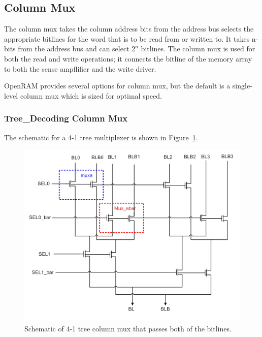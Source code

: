 \subsection{Column Mux}

The column mux takes the column address bits from the address bus
selects the appropriate bitlines for the word that is to be read from
or written to.  It takes n-bits from the address bus and can select
$2^n$ bitlines. The column mux is used for both the read and write
operations; it connects the bitline of the memory array to both the
sense ampflifier and the write driver.

OpenRAM provides several options for column mux, but the default
is a single-level column mux which is sized for optimal speed.

\subsubsection{Tree\_Decoding Column Mux}
\label{sec:tree_decoding_column_mux}

The schematic for a 4-1 tree
multiplexer is shown in Figure~\ref{fig:colmux}.

\begin{figure}[h!]
\centering
\includegraphics[scale=.9]{./figs/tree_column_mux_schem.pdf}
\caption{Schematic of 4-1 tree column mux that passes both of the bitlines.}
\label{fig:colmux}
\end{figure}


